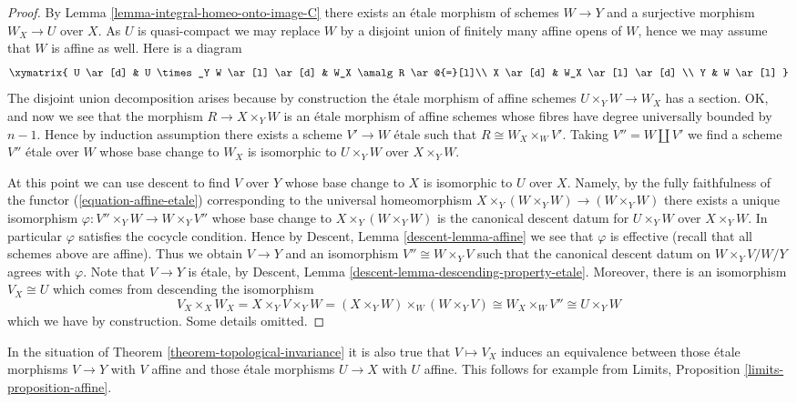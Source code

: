 \begin{proof}
\medskip\noindent
By
Lemma \ref{lemma-integral-homeo-onto-image-C}
there exists an \'etale morphism of schemes $W \to Y$ and a
surjective morphism $W_X \to U$ over $X$.
As $U$ is quasi-compact we may replace $W$ by a disjoint union of
finitely many affine opens of $W$, hence we may assume that $W$
is affine as well. Here is a diagram
$$
\xymatrix{
U \ar[d] & U \times_Y W \ar[l] \ar[d] & W_X \amalg R \ar@{=}[l]\\
X \ar[d] & W_X \ar[l] \ar[d] \\
Y & W \ar[l]
}
$$
The disjoint union decomposition arises because by construction the
\'etale morphism of affine schemes $U \times_Y W \to W_X$ has a section.
OK, and now we see that the morphism $R \to X \times_Y W$ is an \'etale
morphism of affine schemes whose fibres have degree universally bounded
by $n - 1$. Hence by induction assumption there exists a scheme
$V' \to W$ \'etale such that $R \cong W_X \times_W V'$.
Taking $V'' = W \amalg V'$ we find a scheme $V''$ \'etale over $W$ whose
base change to $W_X$ is isomorphic to $U \times_Y W$
over $X \times_Y W$.

\medskip\noindent
At this point we can use descent to find $V$ over $Y$ whose base
change to $X$ is isomorphic to $U$ over $X$. Namely, by the fully
faithfulness of the functor (\ref{equation-affine-etale})
corresponding to the universal homeomorphism
$X \times_Y (W \times_Y W) \to (W \times_Y W)$
there exists a unique isomorphism $\varphi : V'' \times_Y W \to W \times_Y V''$
whose base change to $X \times_Y (W \times_Y W)$ is the canonical
descent datum for $U \times_Y W$ over $X \times_Y W$. In particular
$\varphi$ satisfies the cocycle condition. Hence by
Descent, Lemma \ref{descent-lemma-affine}
we see that $\varphi$ is effective (recall that all schemes above are affine).
Thus we obtain $V \to Y$ and an isomorphism $V'' \cong W \times_Y V$
such that the canonical descent datum on $W \times_Y V/W/Y$ agrees
with $\varphi$. Note that $V \to Y$ is \'etale, by
Descent, Lemma \ref{descent-lemma-descending-property-etale}.
Moreover, there is an isomorphism $V_X \cong U$ which comes from
descending the isomorphism
$$
V_X \times_X W_X =
X \times_Y V \times_Y W =
(X \times_Y W) \times_W (W \times_Y V) \cong
W_X  \times_W V'' \cong U \times_Y W
$$
which we have by construction. Some details omitted.
\end{proof}

\begin{remark}
\label{remark-affine-inside-equivalence}
In the situation of
Theorem \ref{theorem-topological-invariance}
it is also true that $V \mapsto V_X$ induces an equivalence
between those \'etale morphisms $V \to Y$ with $V$ affine and
those \'etale morphisms $U \to X$ with $U$ affine.
This follows for example from
Limits, Proposition \ref{limits-proposition-affine}.
\end{remark}

